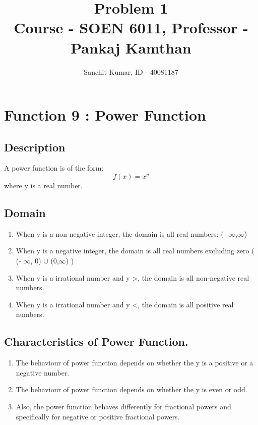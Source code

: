 \documentclass[a4paper,12pt]{article}
\title{Problem 1\\
		\large Course - SOEN 6011, Professor - Pankaj Kamthan}
\author{Sanchit Kumar, ID - 40081187}
\begin{document}
\maketitle %

\section{\large Function 9 : Power Function}

\subsection{Description}
A power function is of the form:
\begin{equation} \label{Power_func}
	f(x) = x^y
\end{equation}
where y is a real number.


\subsection{Domain}
\begin{enumerate}
\item When y is a non-negative integer, the domain is all real numbers:  (- $\infty$,$\infty$)

\item When y is a negative integer, the domain is all real numbers excluding zero ( (- $\infty$, 0) $\cup$ (0,$\infty$) )

\item When y is a irrational number and y \textgreater {}, the domain is all non-negative real numbers.

\item When y is a irrational number and y \textless {}, the domain is all positive real numbers. 
\end{enumerate}


\subsection{Characteristics of Power Function.}
\begin{enumerate}
\item The behaviour of power function depends on whether the y is a positive or a negative number.
\item The behaviour of power function depends on whether the y is even or odd.
\item Also, the power function behaves differently for fractional powers and specifically for negative or positive fractional powers.
\end{enumerate}
\end{document}
